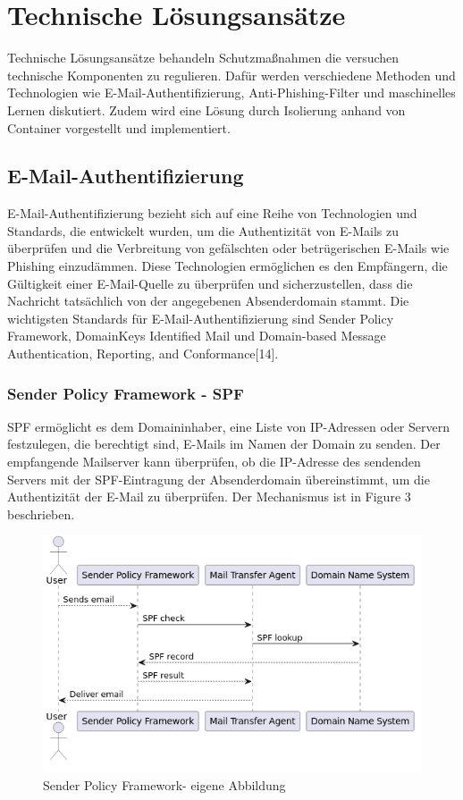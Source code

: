 \documentclass[journal=tosc,final]{iacrtrans}
\begin{document}
\newpage
\section{Technische Lösungsansätze}
Technische Lösungsansätze behandeln Schutzmaßnahmen die versuchen technische Komponenten zu regulieren. Dafür werden verschiedene Methoden und Technologien wie E-Mail-Authentifizierung, Anti-Phishing-Filter und maschinelles Lernen diskutiert. Zudem wird eine Lösung durch Isolierung anhand von Container vorgestellt und implementiert. 
\subsection{E-Mail-Authentifizierung}
E-Mail-Authentifizierung bezieht sich auf eine Reihe von Technologien und Standards, die entwickelt wurden, um die Authentizität von E-Mails zu überprüfen und die Verbreitung von gefälschten oder betrügerischen E-Mails wie Phishing einzudämmen. Diese Technologien ermöglichen es den Empfängern, die Gültigkeit einer E-Mail-Quelle zu überprüfen und sicherzustellen, dass die Nachricht tatsächlich von der angegebenen Absenderdomain stammt. Die wichtigsten Standards für E-Mail-Authentifizierung sind Sender Policy Framework, DomainKeys Identified Mail und Domain-based Message Authentication, Reporting, and Conformance[14].
\subsubsection{Sender Policy Framework - SPF}
SPF ermöglicht es dem Domaininhaber, eine Liste von IP-Adressen oder Servern festzulegen, die berechtigt sind, E-Mails im Namen der Domain zu senden. Der empfangende Mailserver kann überprüfen, ob die IP-Adresse des sendenden Servers mit der SPF-Eintragung der Absenderdomain übereinstimmt, um die Authentizität der E-Mail zu überprüfen. Der Mechanismus ist in Figure 3 beschrieben.

 \begin{figure}[h]
\centering  \caption{Sender Policy Framework- eigene Abbildung}
  \includegraphics[scale=0.5]{spf.png}
 \end{figure}
\end{document}
